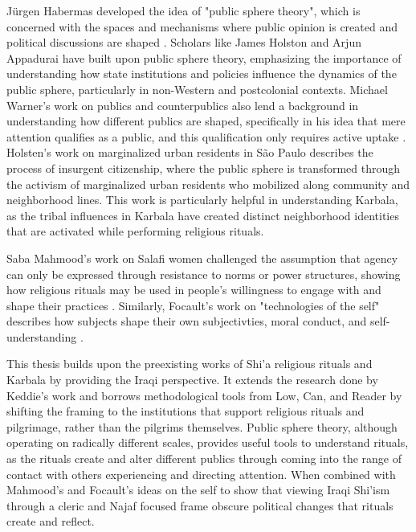 Jürgen Habermas developed the idea of "public sphere theory", which is concerned with the spaces and mechanisms where public opinion is created and political discussions are shaped \cite{habermas_structural_1999}. Scholars like James Holston \cite{holston_insurgent_2008} and Arjun Appadurai \cite{appadurai_fear_2006} have built upon public sphere theory, emphasizing the importance of understanding how state institutions and policies influence the dynamics of the public sphere, particularly in non-Western and postcolonial contexts. Michael Warner's work on publics and counterpublics also lend a background in understanding how different publics are shaped, specifically in his idea that mere attention qualifies as a public, and this qualification only requires active uptake \cite[87]{warner_publics_2010}. Holsten's work on marginalized urban residents in São Paulo describes the process of insurgent citizenship, where the public sphere is transformed through the activism of marginalized urban residents who mobilized along community and neighborhood lines. This work is particularly helpful in understanding Karbala, as the tribal influences in Karbala have created distinct neighborhood identities that are activated while performing religious rituals.

Saba Mahmood's work on Salafi women challenged the assumption that agency can only be expressed through resistance to norms or power structures, showing how religious rituals may be used in people's willingness to engage with and shape their practices \cite{mahmood_politics_2005}. Similarly, Focault's work on "technologies of the self" describes how subjects shape their own subjectivties, moral conduct, and self-understanding \cite{foucault_technologies_1988}.


This thesis builds upon the preexisting works of Shi'a religious rituals and Karbala by providing the Iraqi perspective. It extends the research done by Keddie's work and borrows methodological tools from Low, Can, and Reader by shifting the framing to the institutions that support religious rituals and pilgrimage, rather than the pilgrims themselves. Public sphere theory, although operating on radically different scales, provides useful tools to understand rituals, as the rituals create and alter different publics through coming into the range of contact with others experiencing and directing attention. When combined with Mahmood's and Focault's ideas on the self to show that viewing Iraqi Shi'ism through a cleric and Najaf focused frame obscure political changes that rituals create and reflect.

